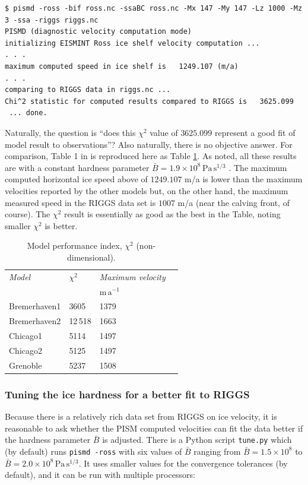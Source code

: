 \documentclass[11pt,final]{amsart}
\begin{document}
\small\begin{verbatim}
$ pismd -ross -bif ross.nc -ssaBC ross.nc -Mx 147 -My 147 -Lz 1000 -Mz 3 -ssa -riggs riggs.nc
PISMD (diagnostic velocity computation mode)
initializing EISMINT Ross ice shelf velocity computation ...
. . .
maximum computed speed in ice shelf is   1249.107 (m/a)
. . .
comparing to RIGGS data in riggs.nc ...
Chi^2 statistic for computed results compared to RIGGS is   3625.099
 ... done.
\end{verbatim}
\normalsize

Naturally, the question is ``does this $\chi^2$ value of $3625.099$ represent a good fit of model result to observations''?  Also naturally, there is no objective answer.  For comparison, Table 1 in \cite{MacAyealetal} is reproduced here as Table \ref{tab:chisqr}.  As noted, all these results are with a constant hardness parameter $\bar B = 1.9 \times 10^8 \, \text{Pa}\, \text{s}^{1/3}$ \cite{MacAyealetal}.  The maximum computed horizontal ice speed above of $1249.107$ m/a is lower than the maximum velocities reported by the other models but, on the other hand, the maximum measured speed in the RIGGS data set is $1007$ m/a (near the calving front, of course).  The $\chi^2$ result is essentially as good as the best in the Table, noting smaller $\chi^2$ is better.

\small
\begin{table}[ht]
\caption{Model performance index, $\chi^2$ (non-dimensional).  }\label{tab:chisqr}
\begin{tabular}{@{}llll}\hline
\textsl{Model} & $\chi^2$ & \textsl{Maximum velocity} \\
 & & $\text{m}\,\text{a}^{-1}$ \\ \hline
Bremerhaven1 & 3605 & 1379 \\
Bremerhaven2 & 12\,518 & 1663 \\
Chicago1 & 5114 & 1497 \\
Chicago2 & 5125 & 1497 \\
Grenoble & 5237 & 1508 \\
\hline
\end{tabular}
\end{table}
\normalsize

\subsubsection*{Tuning the ice hardness for a better fit to RIGGS}  Because there is a relatively rich data set from RIGGS on ice velocity, it is reasonable to ask whether the PISM computed velocities can fit the data better if the hardness parameter $\bar B$ is adjusted.  There is a Python script \verb|tune.py| which (by default) runs \verb|pismd -ross| with six values of $\bar B$ ranging from $\bar B = 1.5  \times 10^8$ to $\bar B = 2.0 \times 10^8 \, \text{Pa}\, \text{s}^{1/3}$.  It uses smaller values for the convergence tolerances (by default), and it can be run with multiple processors:
\end{document}
